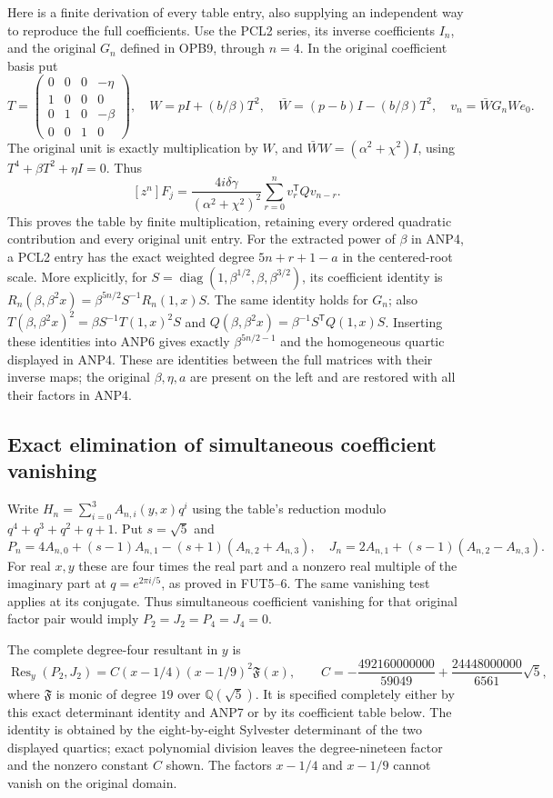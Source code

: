 Here is a finite derivation of every table entry, also supplying an
independent way to reproduce the full coefficients. Use the PCL2
series, its inverse coefficients $I_n$, and the original $G_n$
defined in OPB9, through $n=4$. In the original coefficient basis put
\[
 T=\begin{pmatrix}0&0&0&-\eta\\1&0&0&0\\0&1&0&-\beta\\0&0&1&0\end{pmatrix},
 \quad W=pI+(b/\beta)T^2,\quad
 \bar W=(p-b)I-(b/\beta)T^2,
 \quad v_n=\bar W G_n W e_0.
 \tag{ANP5}
\]
The original unit is exactly multiplication by $W$, and
$\bar WW=(\alpha^2+\chi^2)I$, using
$T^4+\beta T^2+\eta I=0$. Thus
\[
 [z^n]F_j=
 \frac{4i\delta\gamma}{(\alpha^2+\chi^2)^2}
              \sum_{r=0}^n v_r^{\mathsf T}Qv_{n-r}.
 \tag{ANP6}
\]
This proves the table by finite multiplication, retaining every
ordered quadratic contribution and every original unit entry.
For the extracted power of $\beta$ in ANP4, a PCL2 entry has
the exact weighted degree $5n+r+1-a$ in the centered-root scale.
More explicitly, for $S=\operatorname{diag}(1,\beta^{1/2},\beta,\beta^{3/2})$,
its coefficient identity is
$R_n(\beta,\beta^2x)=\beta^{5n/2}S^{-1}R_n(1,x)S$.
The same identity holds for $G_n$; also
$T(\beta,\beta^2x)^2=\beta S^{-1}T(1,x)^2S$ and
$Q(\beta,\beta^2x)=\beta^{-1}S^{\mathsf T}Q(1,x)S$.
Inserting these identities into ANP6 gives exactly
$\beta^{5n/2-1}$ and the homogeneous quartic displayed in ANP4.
These are identities between the full matrices with their inverse
maps; the original $\beta,\eta,a$ are present on the left and
are restored with all their factors in ANP4.

\subsection{Exact elimination of simultaneous coefficient vanishing}
Write $H_n=\sum_{i=0}^3A_{n,i}(y,x)q^i$ using the table's
reduction modulo $q^4+q^3+q^2+q+1$. Put $s=\sqrt5$ and
\[
 P_n=4A_{n,0}+(s-1)A_{n,1}-(s+1)(A_{n,2}+A_{n,3}),
 \quad
 J_n=2A_{n,1}+(s-1)(A_{n,2}-A_{n,3}).
 \tag{ANP7}
\]
For real $x,y$ these are four times the real part and a nonzero
real multiple of the imaginary part at $q=e^{2\pi i/5}$,
as proved in FUT5--6. The same vanishing test applies at its conjugate.
Thus simultaneous coefficient vanishing for that original factor pair
would imply
$P_2=J_2=P_4=J_4=0$.

The complete degree-four resultant in $y$ is
\[
 \operatorname{Res}_y(P_2,J_2)
 =C(x-1/4)(x-1/9)^2\mathfrak F(x),\qquad
 C=-\frac{492160000000}{59049}
      +\frac{24448000000}{6561}\sqrt5,
 \tag{ANP8}
\]
where $\mathfrak F$ is monic of degree $19$ over $\mathbb Q(\sqrt5)$.
It is specified completely either by this exact determinant identity
and ANP7 or by its coefficient table below.
The identity is obtained by the eight-by-eight Sylvester determinant
of the two displayed quartics; exact polynomial division leaves the
degree-nineteen factor and the nonzero constant $C$ shown.
The factors $x-1/4$ and $x-1/9$ cannot vanish on the original domain.

